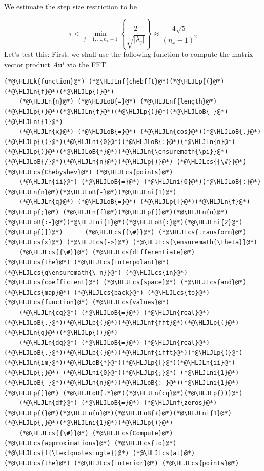 \documentclass[12pt,a4paper]{article}
\newcommand{\HLJLk}[1]{\textcolor[RGB]{148,91,176}{\textbf{#1}}}
\newcommand{\HLJLn}[1]{#1}
\newcommand{\HLJLnf}[1]{\textcolor[RGB]{66,102,213}{#1}}
\newcommand{\HLJLni}[1]{\textcolor[RGB]{59,151,46}{#1}}
\newcommand{\HLJLoB}[1]{\textcolor[RGB]{102,102,102}{\textbf{#1}}}
\newcommand{\HLJLp}[1]{#1}
\newcommand{\HLJLcs}[1]{\textcolor[RGB]{153,153,119}{\textit{#1}}}
\begin{document}
We estimate the step size restriction to be

\[
\tau < \min_{j = 1, \ldots, n_x-1}\left\lbrace \frac{2}{\sqrt{\vert \lambda_j \vert}}\right\rbrace \approx \frac{4\sqrt{5}}{(n_x-1)^2}
\]
Let's test this: First, we shall use the following function to compute the matrix-vector product $A\mathbf{u}^{i}$ via the FFT.


\begin{lstlisting}
(*@\HLJLk{function}@*) (*@\HLJLnf{chebfft}@*)(*@\HLJLp{(}@*)(*@\HLJLn{f}@*)(*@\HLJLp{)}@*)
    (*@\HLJLn{n}@*) (*@\HLJLoB{=}@*) (*@\HLJLnf{length}@*)(*@\HLJLp{(}@*)(*@\HLJLn{f}@*)(*@\HLJLp{)}@*)(*@\HLJLoB{-}@*)(*@\HLJLni{1}@*)
    (*@\HLJLn{x}@*) (*@\HLJLoB{=}@*) (*@\HLJLn{cos}@*)(*@\HLJLoB{.}@*)(*@\HLJLp{((}@*)(*@\HLJLni{0}@*)(*@\HLJLoB{:}@*)(*@\HLJLn{n}@*)(*@\HLJLp{)}@*)(*@\HLJLoB{*}@*)(*@\HLJLn{\ensuremath{\pi}}@*)(*@\HLJLoB{/}@*)(*@\HLJLn{n}@*)(*@\HLJLp{)}@*) (*@\HLJLcs{{\#}}@*) (*@\HLJLcs{Chebyshev}@*) (*@\HLJLcs{points}@*)
    (*@\HLJLn{ii}@*) (*@\HLJLoB{=}@*) (*@\HLJLni{0}@*)(*@\HLJLoB{:}@*)(*@\HLJLn{n}@*)(*@\HLJLoB{-}@*)(*@\HLJLni{1}@*)
    (*@\HLJLn{q}@*) (*@\HLJLoB{=}@*) (*@\HLJLp{[}@*)(*@\HLJLn{f}@*)(*@\HLJLp{;}@*) (*@\HLJLn{f}@*)(*@\HLJLp{[}@*)(*@\HLJLn{n}@*)(*@\HLJLoB{:-}@*)(*@\HLJLni{1}@*)(*@\HLJLoB{:}@*)(*@\HLJLni{2}@*)(*@\HLJLp{]]}@*)      (*@\HLJLcs{{\#}}@*) (*@\HLJLcs{transform}@*) (*@\HLJLcs{x}@*) (*@\HLJLcs{->}@*) (*@\HLJLcs{\ensuremath{\theta}}@*)    
    (*@\HLJLcs{{\#}}@*) (*@\HLJLcs{differentiate}@*) (*@\HLJLcs{the}@*) (*@\HLJLcs{interpolant}@*) (*@\HLJLcs{q\ensuremath{\_n}}@*) (*@\HLJLcs{in}@*) (*@\HLJLcs{coefficient}@*) (*@\HLJLcs{space}@*) (*@\HLJLcs{and}@*) (*@\HLJLcs{map}@*) (*@\HLJLcs{back}@*) (*@\HLJLcs{to}@*) (*@\HLJLcs{function}@*) (*@\HLJLcs{values}@*)
    (*@\HLJLn{cq}@*) (*@\HLJLoB{=}@*) (*@\HLJLn{real}@*)(*@\HLJLoB{.}@*)(*@\HLJLp{(}@*)(*@\HLJLnf{fft}@*)(*@\HLJLp{(}@*)(*@\HLJLn{q}@*)(*@\HLJLp{))}@*)
    (*@\HLJLn{dq}@*) (*@\HLJLoB{=}@*) (*@\HLJLn{real}@*)(*@\HLJLoB{.}@*)(*@\HLJLp{(}@*)(*@\HLJLnf{ifft}@*)(*@\HLJLp{(}@*)(*@\HLJLn{im}@*)(*@\HLJLoB{*}@*)(*@\HLJLp{[}@*)(*@\HLJLn{ii}@*)(*@\HLJLp{;}@*) (*@\HLJLni{0}@*)(*@\HLJLp{;}@*) (*@\HLJLni{1}@*)(*@\HLJLoB{-}@*)(*@\HLJLn{n}@*)(*@\HLJLoB{:-}@*)(*@\HLJLni{1}@*)(*@\HLJLp{]}@*) (*@\HLJLoB{.*}@*)(*@\HLJLn{cq}@*)(*@\HLJLp{))}@*)
    (*@\HLJLn{df}@*) (*@\HLJLoB{=}@*) (*@\HLJLnf{zeros}@*)(*@\HLJLp{(}@*)(*@\HLJLn{n}@*)(*@\HLJLoB{+}@*)(*@\HLJLni{1}@*)(*@\HLJLp{,}@*)(*@\HLJLni{1}@*)(*@\HLJLp{)}@*)
    (*@\HLJLcs{{\#}}@*) (*@\HLJLcs{Compute}@*) (*@\HLJLcs{approximations}@*) (*@\HLJLcs{to}@*) (*@\HLJLcs{f{\textquotesingle}}@*) (*@\HLJLcs{at}@*) (*@\HLJLcs{the}@*) (*@\HLJLcs{interior}@*) (*@\HLJLcs{points}@*)

\end{lstlisting}
\end{document}
